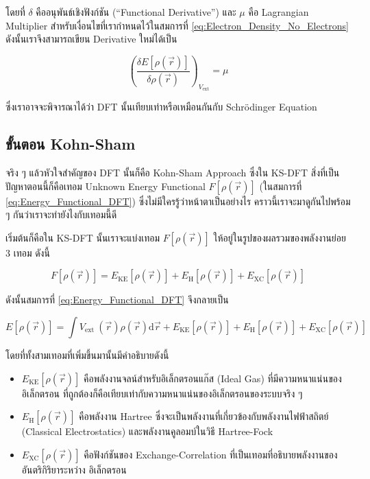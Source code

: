 \noindent โดยที่ $\delta$ คืออนุพันธ์เชิงฟังก์ชัน (\enquote{Functional Derivative}) และ $\mu$ คือ Lagrangian Multiplier
สำหรับเงื่อนไขที่เรากำหนดไว้ในสมการที่ \ref{eq:Electron_Density_No_Electrons} ดังนั้นเราจึงสามารถเขียน Derivative ใหม่ได้เป็น

\begin{equation}
    \left(\frac{\delta E[\rho(\vec{r})]}{\delta \rho(\vec{r})}\right)_{V_{\mathrm{ext}}} = \mu
\end{equation}

\noindent ซึ่งเราอาจจะพิจารณาได้ว่า DFT นั้นเทียบเท่าหรือเหมือนกันกับ Schr\"{o}dinger Equation

\subsection{ขั้นตอน Kohn-Sham}

จริง ๆ แล้วหัวใจสำคัญของ DFT นั้นก็คือ Kohn-Sham Approach ซึ่งใน KS-DFT สิ่งที่เป็นปัญหาตอนนี้ก็คือเทอม Unknown Energy Functional
$F[\rho(\vec{r})]$ (ในสมการที่ \ref{eq:Energy_Functional_DFT}) ซึ่งไม่มีใครรู้ว่าหน้าตาเป็นอย่างไร คราวนี้เราจะมาดูกันไปพร้อม ๆ
กันว่าเราจะทำยังไงกับเทอมนี้ดี

เริ่มต้นก็คือใน KS-DFT นั้นเราจะแบ่งเทอม $F[\rho(\vec{r})]$ ให้อยู่ในรูปของผลรวมของพลังงานย่อย 3 เทอม ดังนี้

\begin{equation}
    F[\rho(\vec{r})]
    =
    E_{\text{KE}}[\rho(\vec{r})]
    + E_{\text{H}}[\rho(\vec{r})]
    + E_{\text{XC}}[\rho(\vec{r})]
\end{equation}

\noindent ดังนั้นสมการที่ \ref{eq:Energy_Functional_DFT} จึงกลายเป็น

\begin{equation}
    E[\rho(\vec{r})]
    =
    \int V_{\text{ext }}(\vec{r}) \rho(\vec{r}) \mathrm{d} \vec{r}
    + E_{\text{KE}}[\rho(\vec{r})]
    + E_{\text{H}}[\rho(\vec{r})]
    + E_{\text{XC}}[\rho(\vec{r})]
\end{equation}

\noindent โดยที่ทั้งสามเทอมที่เพิ่มขึ้นมานั้นมีคำอธิบายดังนี้

\begin{itemize}
    \item $E_{\text{KE}}[\rho(\vec{r})]$ คือพลังงานจลน์สำหรับอิเล็กตรอนแก๊ส (Ideal Gas) ที่มีความหนาแน่นของอิเล็กตรอน%
          ที่ถูกต้องก็คือเทียบเท่ากับความหนาแน่นของอิเล็กตรอนของระบบจริง ๆ

    \item $E_{\text{H}}[\rho(\vec{r})]$ คือพลังงาน Hartree ซึ่งจะเป็นพลังงานที่เกี่ยวข้องกับพลังงานไฟฟ้าสถิตย์ (Classical
          Electrostatics) และพลังงานคูลอมบ์ในวิธี Hartree-Fock

    \item $E_{\text{XC}}[\rho(\vec{r})]$ คือฟังก์ชันของ Exchange-Correlation ที่เป็นเทอมที่อธิบายพลังงานของอันตริกิริยาระหว่าง%
          อิเล็กตรอน
\end{itemize}

